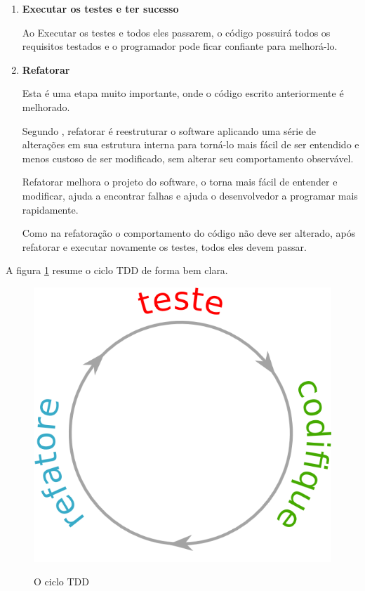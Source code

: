 \begin{enumerate}
\item \textbf{Executar os testes e ter sucesso}

Ao Executar os testes e todos eles passarem, o código possuirá todos os requisitos testados e o programador pode ficar confiante para melhorá-lo.

\item \textbf{Refatorar}

Esta é uma etapa muito importante, onde o código escrito anteriormente é melhorado.

Segundo , refatorar é reestruturar o software aplicando uma série de alterações em sua estrutura interna para torná-lo mais fácil de ser entendido e menos custoso de ser modificado, sem alterar seu comportamento observável.

Refatorar melhora o projeto do software, o torna mais fácil de entender e modificar, ajuda a encontrar falhas e ajuda o desenvolvedor a programar mais rapidamente.

Como na refatoração o comportamento do código não deve ser alterado, após refatorar e executar novamente os testes, todos eles devem passar.

\end{enumerate}

A figura \ref{img:ciclo-tdd} resume o ciclo TDD de forma bem clara.

\begin{figure}[h]
  \center
  \caption{O ciclo TDD}
  \includegraphics[scale=0.45]{images/ciclo-tdd}
  \label{img:ciclo-tdd}
\end{figure}

